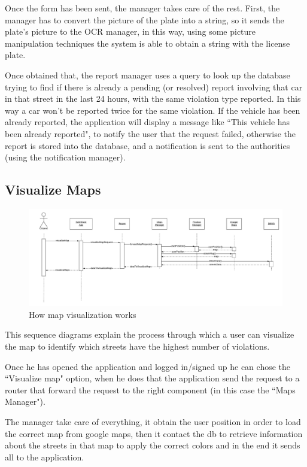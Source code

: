 \documentclass[12pt,a4paper]{report}
\begin{document}
				Once the form has been sent, the manager takes care of the rest. First, the manager has to convert
				the picture of the plate into a string, so it sends the plate's picture to the OCR manager, in this way, using some
				picture manipulation techniques the system is able to obtain a string with the license plate.


				Once obtained that, the report manager uses a query to look up the database trying to find if there is already a	pending (or resolved) report involving that car in that street in the last 24 hours, with the same violation type reported. In this way a car won't be reported twice for the	same violation. If the vehicle has been already reported, the application will display a message like ``This vehicle has been already reported", to notify the user that the request failed, otherwise the report is stored into the database, and a notification is sent to the authorities (using the notification manager).
			\subsection{Visualize Maps}
				\begin{figure}[H]
						\includegraphics[width = \textwidth, center]{Maps}
						\caption{How map visualization works}
						\label{fig: diagrams}
				\end{figure}

				This sequence diagrams explain the process through which a user can visualize the map to identify which
				streets have the highest number of violations.


				Once he has opened the application and logged in/signed up he can chose the ``Visualize map" option,
				when he does that the application send the request to a router that forward the request to the right
				component (in this case the ``Maps Manager").


				The manager take care of everything, it obtain the user position in order to load the correct map from google
				maps, then it contact the db to retrieve information about the streets in that map to apply the correct colors
				and in the end it sends all to the application.
\end{document}
